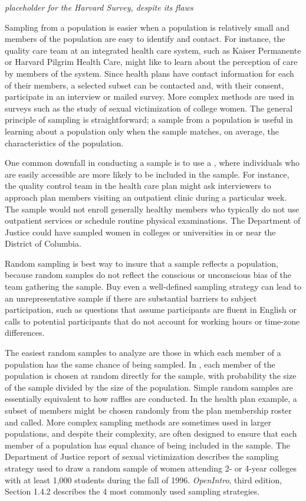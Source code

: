 \begin{doublespace}
 \textit{placeholder for the Harvard Survey, despite its flaws}


Sampling from a population is easier when a population is relatively small and members of the population are easy to identify and contact.  For instance, the quality care team at an integrated health care system, such as Kaiser Permanente or Harvard Pilgrim Health Care, might like to learn about the perception of care by members of the system.  Since health plans have contact information for each of their members, a selected subset can be contacted and, with their consent, participate in an interview or mailed survey.  More complex methods are used in surveys such as the study of sexual victimization of college women.  The general principle of sampling is straightforward; a sample from a population is useful in learning about a population only when the sample matches, on average, the characteristics of the population.  

One common downfall in conducting a sample is to use  a , where individuals who are easily accessible are more likely to be included in the sample. For instance, the quality control team in the health care plan might ask interviewers to approach plan members visiting an outpatient clinic during a particular week.  The sample would not enroll generally healthy members who typically do not use outpatient services or schedule routine physical examinations. The Department of Justice could have sampled women in colleges or universities in or near the District of Columbia.

Random sampling is best way to insure that a sample reflects a population, because random samples do not reflect the conscious or unconscious bias of the team gathering the sample.  Buy even a well-defined sampling strategy can lead to an unrepresentative sample if there are substantial barriers to subject participation, such as questions that assume participants are fluent in English or calls to potential participants that do not account for working hours or time-zone differences.   

The easiest random samples to analyze are those in which each member of a population has the same chance of being sampled. In , each member of the population is chosen at random directly for the sample, with probability the size of the sample divided by the size of the population. Simple random samples are essentially equivalent to how raffles are conducted. In the health plan example, a subset of members might be chosen randomly from the plan membership roster and called.  More complex sampling methods are sometimes used in larger populations, and despite their complexity, are often designed to ensure that each member of a population has equal chance of being included in the sample.  The Department of Justice report of sexual victimization describes the sampling strategy used to draw a random sample of women attending 2- or 4-year colleges with at least 1,000 students during the fall of 1996.  \textsl{OpenIntro}, third edition, Section 1.4.2 describes the 4 most commonly used sampling strategies.
 

\end{doublespace}
